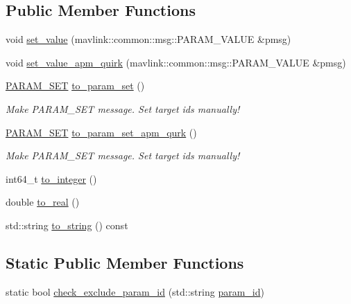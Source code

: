 \subsection*{Public Member Functions}
\begin{DoxyCompactItemize}
\item 
void \mbox{\hyperlink{group__plugin_gaacaefc75948fab6cb140c8fbe6a9398e}{set\+\_\+value}} (mavlink\+::common\+::msg\+::\+P\+A\+R\+A\+M\+\_\+\+V\+A\+L\+UE \&pmsg)
\item 
void \mbox{\hyperlink{group__plugin_ga3dbec960ba82630bd31abb9dcca666c8}{set\+\_\+value\+\_\+apm\+\_\+quirk}} (mavlink\+::common\+::msg\+::\+P\+A\+R\+A\+M\+\_\+\+V\+A\+L\+UE \&pmsg)
\item 
\mbox{\hyperlink{group__plugin_gaa94f933e0249802ee1985cb650408c31}{P\+A\+R\+A\+M\+\_\+\+S\+ET}} \mbox{\hyperlink{group__plugin_ga4b2fdb771fa5acf1f2ec5224636f603f}{to\+\_\+param\+\_\+set}} ()
\begin{DoxyCompactList}\small\item\em Make P\+A\+R\+A\+M\+\_\+\+S\+ET message. Set target ids manually! \end{DoxyCompactList}\item 
\mbox{\hyperlink{group__plugin_gaa94f933e0249802ee1985cb650408c31}{P\+A\+R\+A\+M\+\_\+\+S\+ET}} \mbox{\hyperlink{group__plugin_gac1ad9cfef5618f54cf828438bb98cb03}{to\+\_\+param\+\_\+set\+\_\+apm\+\_\+qurk}} ()
\begin{DoxyCompactList}\small\item\em Make P\+A\+R\+A\+M\+\_\+\+S\+ET message. Set target ids manually! \end{DoxyCompactList}\item 
int64\+\_\+t \mbox{\hyperlink{group__plugin_gae72d53f3c84fe6c018f95d55510f78b8}{to\+\_\+integer}} ()
\item 
double \mbox{\hyperlink{group__plugin_ga687f8cff04b669b9d15aacd19ec0af23}{to\+\_\+real}} ()
\item 
std\+::string \mbox{\hyperlink{group__plugin_ga37cec503b8ebce4ccf83c34b3cc1a5c3}{to\+\_\+string}} () const
\end{DoxyCompactItemize}
\subsection*{Static Public Member Functions}
\begin{DoxyCompactItemize}
\item 
static bool \mbox{\hyperlink{group__plugin_ga90b347f43583c077d87ec34b7bfb7164}{check\+\_\+exclude\+\_\+param\+\_\+id}} (std\+::string \mbox{\hyperlink{group__plugin_ga6e9b1d000a31b2ca2773ff03c28980da}{param\+\_\+id}})
\end{DoxyCompactItemize}
